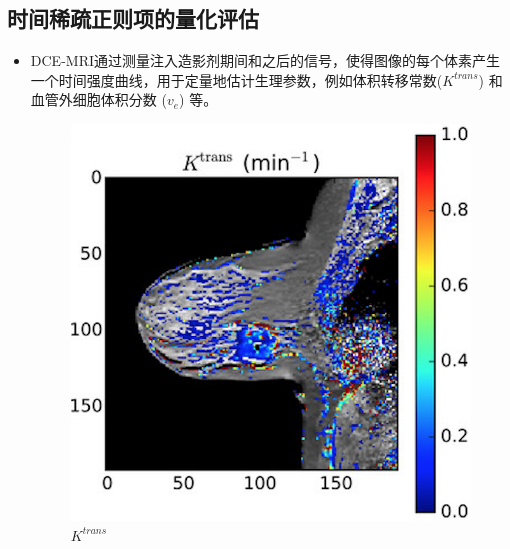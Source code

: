 \documentclass{beamer}
\begin{document}
\subsection{时间稀疏正则项的量化评估}
\begin{frame}
	\begin{itemize}
		\item DCE-MRI通过测量注入造影剂期间和之后的信号，使得图像的每个体素产生一个时间强度曲线，用于定量地估计生理参数，例如体积转移常数($K^{trans}$) 和血管外细胞体积分数 ($v_e$) 等。
		\begin{figure}[htbp]
\begin{minipage}[t]{0.3\textwidth}
\centering
\includegraphics[width=\textwidth]{ktrans.png}
\\ $K^{trans}$
\end{minipage}
\hspace{1cm}
\begin{minipage}[t]{0.3\textwidth}
\centering

\end{minipage}
\end{figure}
\end{itemize}
\end{frame}
\end{document}
